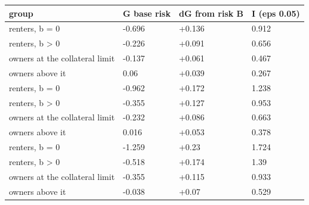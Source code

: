 \begingroup\small
\setlength{\tabcolsep}{3pt}
\renewcommand{\arraystretch}{1.04}
\begin{tabularx}{\linewidth}{XXXX}
\toprule
group & G base risk & dG from risk B & I (eps 0.05) \\
\midrule
renters, b = 0 & -0.696 & +0.136 & 0.912 \\
renters, b \textgreater{} 0 & -0.226 & +0.091 & 0.656 \\
owners at the collateral limit & -0.137 & +0.061 & 0.467 \\
owners above it & 0.06 & +0.039 & 0.267 \\
renters, b = 0 & -0.962 & +0.172 & 1.238 \\
renters, b \textgreater{} 0 & -0.355 & +0.127 & 0.953 \\
owners at the collateral limit & -0.232 & +0.086 & 0.663 \\
owners above it & 0.016 & +0.053 & 0.378 \\
renters, b = 0 & -1.259 & +0.23 & 1.724 \\
renters, b \textgreater{} 0 & -0.518 & +0.174 & 1.39 \\
owners at the collateral limit & -0.355 & +0.115 & 0.933 \\
owners above it & -0.038 & +0.07 & 0.529 \\
\bottomrule
\end{tabularx}
\endgroup
